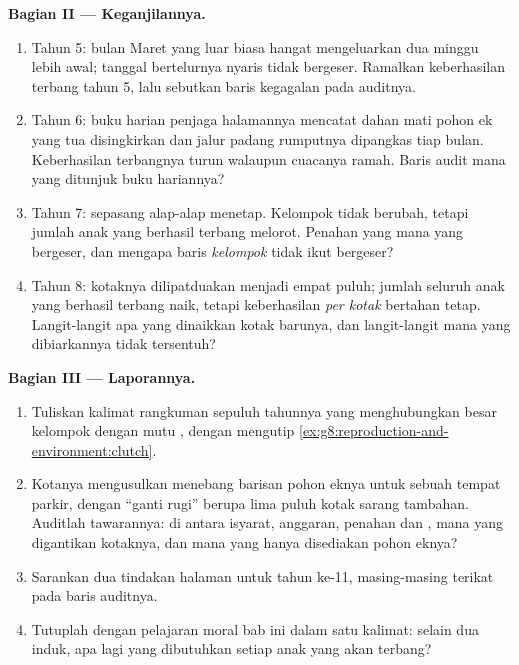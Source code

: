 \begin{problem}
\medskip\noindent\textbf{Bagian II --- Keganjilannya.}
\begin{enumerate}[resume]
  \item Tahun 5: bulan Maret yang luar biasa hangat mengeluarkan
         dua minggu lebih awal; tanggal bertelurnya nyaris
        tidak bergeser. Ramalkan keberhasilan terbang tahun 5, lalu
        sebutkan baris kegagalan pada auditnya.
  \item Tahun 6: buku harian penjaga halamannya mencatat dahan mati
        pohon ek yang tua disingkirkan dan jalur padang rumputnya
        dipangkas tiap bulan. Keberhasilan terbangnya turun walaupun
        cuacanya ramah. Baris audit mana yang ditunjuk buku hariannya?
  \item Tahun 7: sepasang alap-alap menetap. Kelompok  tidak
        berubah, tetapi jumlah anak yang berhasil terbang melorot.
        Penahan yang mana yang bergeser, dan mengapa baris
        \emph{kelompok } tidak ikut bergeser?
  \item Tahun 8: kotaknya dilipatduakan menjadi empat puluh; jumlah
        seluruh anak yang berhasil terbang naik, tetapi keberhasilan
        \emph{per kotak} bertahan tetap. Langit-langit apa yang
        dinaikkan kotak barunya, dan langit-langit mana yang
        dibiarkannya tidak tersentuh?
\end{enumerate}

\medskip\noindent\textbf{Bagian III --- Laporannya.}
\begin{enumerate}[resume]
  \item Tuliskan kalimat rangkuman sepuluh tahunnya yang menghubungkan
        besar kelompok  dengan mutu , dengan mengutip
        \cref{ex:g8:reproduction-and-environment:clutch}.
  \item Kotanya mengusulkan menebang barisan pohon eknya untuk sebuah
        tempat parkir, dengan ``ganti rugi'' berupa lima puluh kotak
        sarang tambahan. Auditlah tawarannya: di antara isyarat,
        anggaran, penahan dan , mana yang digantikan kotaknya,
        dan mana yang hanya disediakan pohon eknya?
  \item Sarankan dua tindakan halaman untuk tahun ke-11, masing-masing
        terikat pada baris auditnya.
  \item Tutuplah dengan pelajaran moral bab ini dalam satu kalimat:
        selain dua induk, apa lagi yang dibutuhkan setiap anak yang
        akan terbang?
\end{enumerate}
\end{problem}

